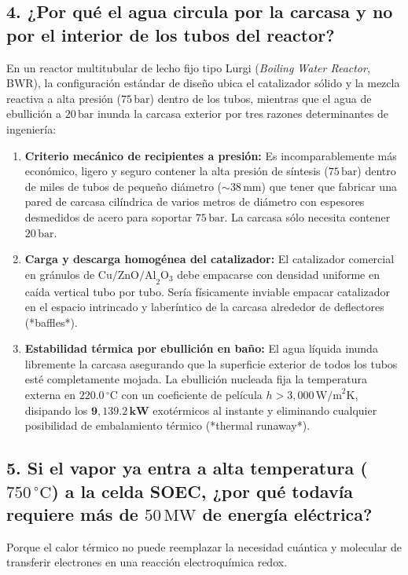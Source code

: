 \documentclass[11pt,a4paper]{article}
\begin{document}
\subsection{4. ¿Por qué el agua circula por la carcasa y no por el interior de los tubos del reactor?}
En un reactor multitubular de lecho fijo tipo Lurgi (\textit{Boiling Water Reactor}, BWR), la configuración estándar de diseño ubica el catalizador sólido y la mezcla reactiva a alta presión ($75\,\text{bar}$) dentro de los tubos, mientras que el agua de ebullición a $20\,\text{bar}$ inunda la carcasa exterior por tres razones determinantes de ingeniería:
\begin{enumerate}
    \item \textbf{Criterio mecánico de recipientes a presión:} Es incomparablemente más económico, ligero y seguro contener la alta presión de síntesis ($75\,\text{bar}$) dentro de miles de tubos de pequeño diámetro ($\sim 38\,\text{mm}$) que tener que fabricar una pared de carcasa cilíndrica de varios metros de diámetro con espesores desmedidos de acero para soportar $75\,\text{bar}$. La carcasa sólo necesita contener $20\,\text{bar}$.
    \item \textbf{Carga y descarga homogénea del catalizador:} El catalizador comercial en gránulos de $\text{Cu/ZnO/Al}_2\text{O}_3$ debe empacarse con densidad uniforme en caída vertical tubo por tubo. Sería físicamente inviable empacar catalizador en el espacio intrincado y laberíntico de la carcasa alrededor de deflectores (*baffles*).
    \item \textbf{Estabilidad térmica por ebullición en baño:} El agua líquida inunda libremente la carcasa asegurando que la superficie exterior de todos los tubos esté completamente mojada. La ebullición nucleada fija la temperatura externa en $220.0\,^\circ\text{C}$ con un coeficiente de película $h > 3{,}000\,\text{W/m}^2\text{K}$, disipando los $\mathbf{9{,}139.2\,\text{kW}}$ exotérmicos al instante y eliminando cualquier posibilidad de embalamiento térmico (*thermal runaway*).
\end{enumerate}

\subsection{5. Si el vapor ya entra a alta temperatura (\texorpdfstring{$750\,^\circ\text{C}$}{750 °C}) a la celda SOEC, ¿por qué todavía requiere más de \texorpdfstring{$50\,\text{MW}$}{50 MW} de energía eléctrica?}
Porque el calor térmico no puede reemplazar la necesidad cuántica y molecular de transferir electrones en una reacción electroquímica redox.
\end{document}
